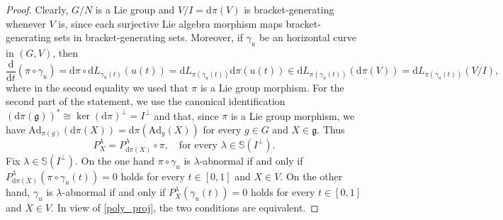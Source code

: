 \documentclass[10pt,a4paper]{amsart}
\newcommand{\Ad}{\mathrm{Ad}}
\newcommand{\ddt}{\frac{\de}{\de t}}
\newcommand{\de}{\mathrm{d}}
\newcommand{\g}{\mathfrak{g}}
\begin{document}
\begin{proof}
    Clearly, $G/N$ is a Lie group and $V/I= \de\pi(V)$ is bracket-generating whenever $V$ is, since each surjective Lie algebra morphism maps bracket-generating sets in bracket-generating sets. Moreover, if $\gamma_u$ be an horizontal curve in $(G,V)$, then
    \begin{equation*}
        \ddt (\pi \circ \gamma_u) = \de \pi \circ \de L_{\gamma_u(t)}(u(t))= \de L_{\pi(\gamma_u(t))} \de \pi(u(t)) \in  \de L_{\pi(\gamma_u(t))}(\de\pi(V))= \de L_{\pi(\gamma_u(t))}(V/I),
            \end{equation*}
        where in the second equality we used that $\pi$ is a Lie group morphism. For the second part of the statement, we use the canonical identification $\left(\de \pi(\g)\right)^* \cong \ker(\de \pi)^\perp = I^\perp$ and that, since $\pi$ is a Lie group morphism, we have $\Ad_{\pi(g)}(\de \pi(X)) = \de \pi \left(\Ad_g(X)\right)$ for every $g \in G$ and $X \in \g$. Thus
        \begin{equation} \label{poly_proj}
            P^\lambda_X = P^\lambda_{\de\pi(X)} \circ \pi, \quad \text{for every $\lambda \in \mathbb{S}(I^\perp)$.}
        \end{equation}
        Fix $\lambda \in \mathbb{S}(I^\perp)$. On the one hand $\pi \circ \gamma_u$ is $\lambda$-abnormal if and only if $P^\lambda_{\de \pi(X)}(\pi \circ \gamma_u(t))=0$ holds for every $t \in [0,1]$ and $X \in V$. On the other hand, $\gamma_u$ is $\lambda$-abnormal if and only if $P^\lambda_X(\gamma_u(t))=0$ holds for every $t \in [0,1]$ and $X \in V$. In view of \eqref{poly_proj}, the two conditions are equivalent.
\end{proof}
\end{document}
